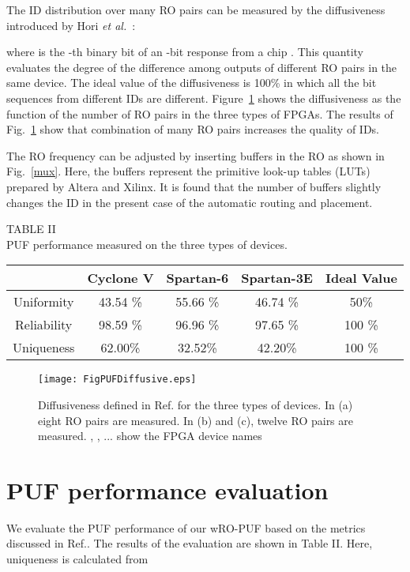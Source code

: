 ﻿\documentclass[aps,preprint,prb,superscriptaddress,amsmath,showpacs,tightenlines]{revtex4}
\begin{document}
The ID distribution over many RO pairs can be 
measured by the diffusiveness introduced by Hori {\it et al.}~\cite{Hori}:

where  is the -th binary bit of an -bit response from a chip .
This quantity evaluates the degree of the difference among outputs of different RO pairs 
in the same device.
The ideal value of the diffusiveness is 100\% in which all the bit
sequences from different IDs are different.
Figure~\ref{diffusive} shows the diffusiveness as the 
function of the number of RO pairs in the three types of FPGAs.
The results of Fig.~\ref{diffusive} show that 
combination of many RO pairs increases the quality of IDs.

The RO frequency can be adjusted by inserting buffers in the RO as shown 
in Fig.~\ref{mux}. Here, the buffers represent the primitive look-up tables (LUTs) prepared by 
Altera and Xilinx. 
It is found that the number of buffers  slightly changes the ID 
in the present case of the automatic routing and placement. 


\begin{table}
\begin{center}
TABLE II\\
{PUF performance measured on the three types of devices}. 
\end{center}
\begin{tabular}{|c|c|c|c|c|}\hline
&  Cyclone V &  Spartan-6 &  Spartan-3E &  Ideal Value
\\ \hline
Uniformity 
& 43.54  \%
& 55.66 \%
& 46.74 \%
& 50\%
\\
Reliability
& 98.59 \%
& 96.96 \%
& 97.65 \%
& 100 \%
\\
Uniqueness
& 62.00\%
& 32.52\%
& 42.20\%
& 100 \%
\\ \hline
\end{tabular}
\end{table}
\begin{figure}
\centering
\texttt{[image: FigPUFDiffusive.eps]}
\caption{
Diffusiveness defined in Ref.\cite{Hori} for 
the three types of devices.
In (a) eight RO pairs are measured. In (b) and (c), twelve RO pairs are measured.
, , ... show the FPGA device names} 
\label{diffusive}
\end{figure}





\section{PUF performance evaluation}
We evaluate the PUF performance of our wRO-PUF based 
on the metrics discussed in Ref.\cite{Maiti3,Hori}.
The results of the evaluation are shown in Table II.
Here, uniqueness is calculated from
\end{document}
